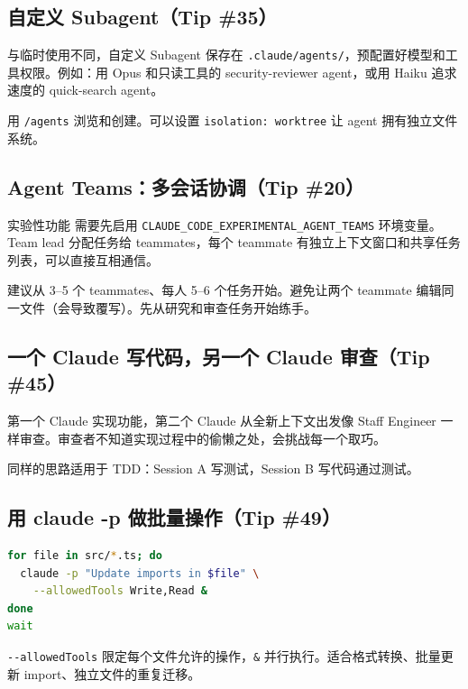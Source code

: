 \documentclass[a4paper]{article}
\begin{document}
\subsection{自定义 Subagent（Tip \#35）}

与临时使用不同，自定义 Subagent 保存在 \texttt{.claude/agents/}，预配置好模型和工具权限。例如：用 Opus 和只读工具的 security-reviewer agent，或用 Haiku 追求速度的 quick-search agent。

用 \texttt{/agents} 浏览和创建。可以设置 \texttt{isolation: worktree} 让 agent 拥有独立文件系统。

\subsection{Agent Teams：多会话协调（Tip \#20）}

\begin{knowledgebox}{实验性功能}
需要先启用 \texttt{CLAUDE\_CODE\_EXPERIMENTAL\_AGENT\_TEAMS} 环境变量。Team lead 分配任务给 teammates，每个 teammate 有独立上下文窗口和共享任务列表，可以直接互相通信。

建议从 3--5 个 teammates、每人 5--6 个任务开始。避免让两个 teammate 编辑同一文件（会导致覆写）。先从研究和审查任务开始练手。
\end{knowledgebox}

\subsection{一个 Claude 写代码，另一个 Claude 审查（Tip \#45）}

第一个 Claude 实现功能，第二个 Claude 从全新上下文出发像 Staff Engineer 一样审查。审查者不知道实现过程中的偷懒之处，会挑战每一个取巧。

同样的思路适用于 TDD：Session A 写测试，Session B 写代码通过测试。

\subsection{用 claude -p 做批量操作（Tip \#49）}

\begin{lstlisting}[caption={批量操作示例}, language=bash]
for file in src/*.ts; do
  claude -p "Update imports in $file" \
    --allowedTools Write,Read &
done
wait
\end{lstlisting}

\texttt{-{}-allowedTools} 限定每个文件允许的操作，\texttt{\&} 并行执行。适合格式转换、批量更新 import、独立文件的重复迁移。
\end{document}
